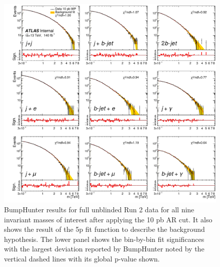 \newpage

\begin{figure}[H]
    \centering
    \includegraphics[scale=0.8]{figs/ch6/results/pub_mass_BH_10pb_yellow.pdf}%
\caption{BumpHunter results for full unblinded Run 2 data for all nine invariant masses of interest after applying the 10 pb AR cut. It also shows the result of the 
5p fit function to describe the background hypothesis. The lower panel shows the bin-by-bin fit significances with the largest deviation reported by BumpHunter noted by the 
vertical dashed lines with its global p-value shown.}
\label{fig:results-data-after}
\end{figure}

\newpage

